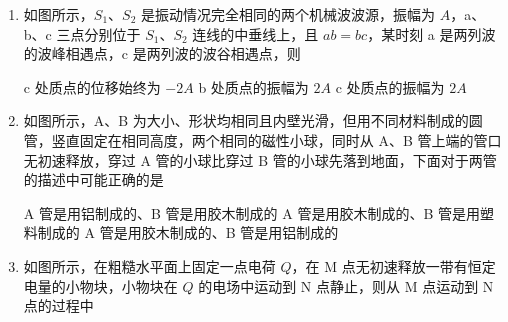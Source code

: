 \documentclass[\gkver]{gaokaozhenti}
\begin{document}
\begin{enumerate}

\item
如图所示，$S_{1}$、$S_{2}$ 是振动情况完全相同的两个机械波波源，振幅为 $A$，a、b、c 三点分别位于 $S_{1}$、$S_{2}$ 连线的中垂线上，且 $ab=bc$，某时刻 a 是两列波的波峰相遇点，c 是两列波的波谷相遇点，则

\onepicture[w=4.66cm]{}

{c 处质点的位移始终为 $-2A$}
{b 处质点的振幅为 $2A$}
{c 处质点的振幅为 $2A$}


\item
如图所示，A、B 为大小、形状均相同且内壁光滑，但用不同材料制成的圆管，竖直固定在相同高度，两个相同的磁性小球，同时从 A、B 管上端的管口无初速释放，穿过 A 管的小球比穿过 B 管的小球先落到地面，下面对于两管的描述中可能正确的是

\onepicture[h=3.87cm]{}

{A 管是用铝制成的、B 管是用胶木制成的}
{A 管是用胶木制成的、B 管是用塑料制成的}
{A 管是用胶木制成的、B 管是用铝制成的}


\item
如图所示，在粗糙水平面上固定一点电荷 $Q$，在 M 点无初速释放一带有恒定电量的小物块，小物块在 $Q$ 的电场中运动到 N 点静止，则从 M 点运动到 N 点的过程中


\end{enumerate}
\end{document}
